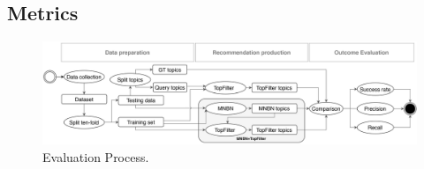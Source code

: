 

\subsection{Metrics}\label{sec:metrics}

\begin{figure}[t!]
	\centering
	\includegraphics[width=0.80\linewidth,keepaspectratio]{figs/evaluationCF.pdf}
	\caption{Evaluation Process.}
	\label{fig:EvaluationProcess}
	\vspace{-.3cm}
\end{figure}


